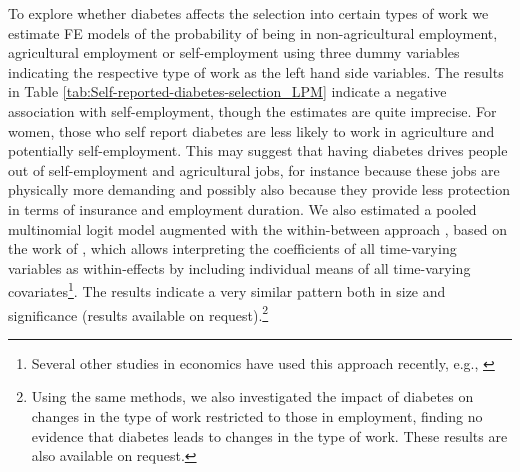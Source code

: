 \documentclass[12pt,english]{article}
\begin{document}
{To explore whether diabetes affects the selection into certain types of work we estimate \ac{FE} models of the probability of being in non-agricultural employment, agricultural employment or self-employment using three dummy variables indicating the respective type of work as the left hand side variables. The results in Table \ref{tab:Self-reported-diabetes-selection_LPM} indicate a negative association with self-employment, though the estimates are quite imprecise. For women, those who self report diabetes are less likely to work in agriculture and potentially self-employment. This may suggest that having diabetes drives people out of self-employment and agricultural jobs, for instance because these jobs are physically more demanding and possibly also because they provide less protection in terms of insurance and employment duration. We also estimated a pooled multinomial logit model augmented  with the within-between approach \parencite{Bell2015}, based on the work of \textcite{Mundlak1978}, which allows interpreting the coefficients of all time-varying variables as within-effects by including individual means of all time-varying covariates\footnote{Several other studies in economics have used this approach recently, e.g., \textcite{Geishecker2011,Wunder2014,Boll2016}}. The results indicate a very similar pattern both in size and significance (results available on request).\footnote{Using the same methods, we also investigated the impact of diabetes on changes in the type of work restricted to those in employment, finding no evidence that diabetes leads to changes in the type of work. These results are also available on request.}


}
\end{document}
